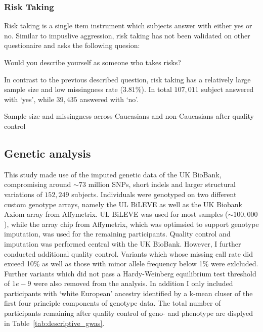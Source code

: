 \subsubsection{Risk Taking}
\label{ssub:risk_taking}
Risk taking is a single item instrument which subjects answer with either yes or no.
Similar to impuslive aggression, risk taking has not been validated on other questionaire and asks the following quesion:
\begin{displayquote}
  Would you describe yourself as someone who takes risks?
\end{displayquote}
In contrast to the previous described question, risk taking has a relatively large sample size and low missingness rate ($3.81\%$).
In total $107,011$ subject answered with `yes', while $39,435$ answered with `no'.

\begin{table}[!htpb]
	\centering
	\resizebox{\textwidth}{!}{}
  \caption{Sample size and missingness across Caucasians and non-Caucasians after quality control}\label{tab:descriptive_gwas} 
\end{table}

\subsection{Genetic analysis}
\label{sub:genetic_analysis}
This study made use of the imputed genetic data of the UK BioBank, compromising around $\sim73$ million SNPs, short indels and larger structural variations of $152,249$ subjects.
Individuals were genotyped on two different custom genotype arrays, namely the UL BiLEVE as well as the UK Biobank Axiom array from Affymetrix. 
UL BiLEVE was used for most samples ($\sim100,000$), while the array chip from Affymetrix, which was optimsied to support genotype imputation, was used for the remaining participants. 
Quality control and imputation was performed central with the UK BioBank.
However, I further conducted additional quality control.
Variants which whose missing call rate did exceed 10\% as well as those with minor allele frequency below 1\% were exlcluded.
Further variants which did not pass a Hardy-Weinberg equilibrium test threshold of $1e-9$ were also removed from the analysis.
In addition I only included participants with `white European' ancestry identified by a k-mean cluser of the first four principle components of genotype data.
The total number of participants remaining after quality control of geno- and phenotype are displyed in Table~\ref{tab:descriptive_gwas}.

